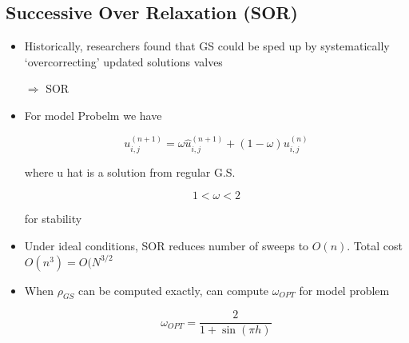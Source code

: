 \subsection{Successive Over Relaxation (SOR)}

\begin{itemize}
    \item Historically, researchers found that GS could be sped up by systematically `overcorrecting' updated solutions valves

    $\Rightarrow$ SOR

    \item For model Probelm we have 

    \[ u_{i,j}^{(n+1)} = \omega \hat{u}_{i,j}^{(n+1)} + (1-\omega) u_{i,j}^{(n)}\]

    where u hat is a solution from regular G.S.

    \[ 1 < \omega < 2\]

    for stability 

    \item Under ideal conditions, SOR reduces number of sweeps to $O(n)$. Total cost $O(n^3) = O(N^{3/2}$

    \item When $\rho_{GS}$ can be computed exactly, can compute $\omega_{OPT}$ for model problem 

    \[ \omega_{OPT} = \frac{2}{1+\sin(\pi h)}\]
    
\end{itemize}
